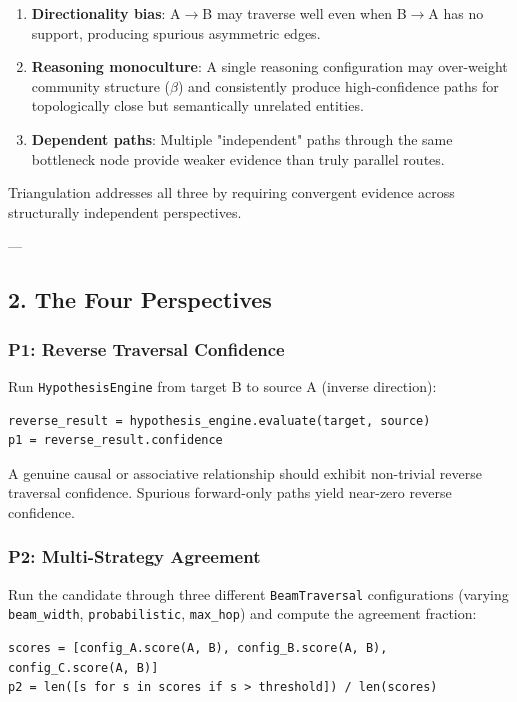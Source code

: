 \begin{enumerate}
\item \textbf{Direct\-ionality bias}: A$\to$B may traverse well even when B$\to$A has no support, producing spurious asymmetric edges.
\item \textbf{Reasoning monoculture}: A single reasoning confi\-guration may over-weight community structure ($\beta$) and consi\-stently produce high-confidence paths for topol\-ogically close but seman\-tically unrelated entities.
\item \textbf{Dependent paths}: Multiple "independent" paths through the same bottleneck node provide weaker evidence than truly parallel routes.

\end{enumerate}
Triang\-ulation addresses all three by requiring convergent evidence across struc\-turally independent persp\-ectives.

---

\subsection{2. The Four Perspe\-ctives}

\subsubsection{P1: Reverse Traversal Confidence}

Run \texttt{HypothesisEngine} from target B to source A (inverse direction):

\begin{lstlisting}
reverse_result = hypothesis_engine.evaluate(target, source)
p1 = reverse_result.confidence
\end{lstlisting}

A genuine causal or associative relat\-ionship should exhibit non-trivial reverse traversal confidence. Spurious forward-only paths yield near-zero reverse confidence.

\subsubsection{P2: Multi-Strategy Agreement}

Run the candidate through three different \texttt{BeamTraversal} confi\-gurations (varying \texttt{beam\_width}, \texttt{probabilistic}, \texttt{max\_hop}) and compute the agreement fraction:

\begin{lstlisting}
scores = [config_A.score(A, B), config_B.score(A, B), config_C.score(A, B)]
p2 = len([s for s in scores if s > threshold]) / len(scores)
\end{lstlisting}

